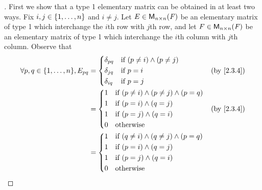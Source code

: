 \begin{proof}[]
	First we show that a type 1 elementary matrix can be obtained in at least two ways.
	Fix \(i, j \in \left\lbrace1, \dots, n\right\rbrace\) and \(i \neq j\).
	Let \(E \in \mathsf{M}_{{n} \times n}({\mathit{F}})\) be an elementary matrix of type 1 which interchange the \(i\)th row with \(j\)th row, and let \(F \in \mathsf{M}_{{n} \times n}({\mathit{F}})\) be an elementary matrix of type 1 which interchange the \(i\)th column with \(j\)th column.
	Observe that
	\begin{align*}
		\forall p, q \in \set{1, \dots, n}, E_{p q} & = \begin{dcases}
			                                                \delta_{p q} & \text{if } (p \neq i) \land (p \neq j) \\
			                                                \delta_{j q} & \text{if } p = i                       \\
			                                                \delta_{i q} & \text{if } p = j
		                                                \end{dcases}    &  & \by{2.3.4}    \\
		                                            & = \begin{dcases}
			                                                1 & \text{if } (p \neq i) \land (p \neq j) \land (p = q) \\
			                                                1 & \text{if } (p = i) \land (q = j)                     \\
			                                                1 & \text{if } (p = j) \land (q = i)                     \\
			                                                0 & \text{otherwise}
		                                                \end{dcases} &  & \by{2.3.4} \\
		                                            & = \begin{dcases}
			                                                1 & \text{if } (q \neq i) \land (q \neq j) \land (p = q) \\
			                                                1 & \text{if } (p = i) \land (q = j)                     \\
			                                                1 & \text{if } (p = j) \land (q = i)                     \\
			                                                0 & \text{otherwise}
		                                                \end{dcases} \\

\end{align*}
\end{proof}
